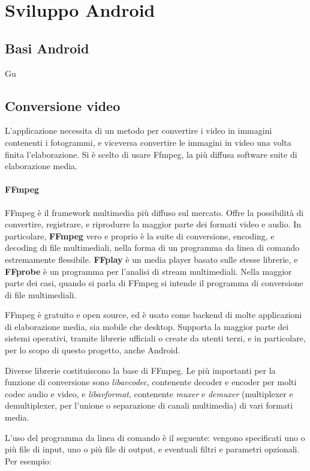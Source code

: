 \chapter{Sviluppo Android}

\section{Basi Android}
Gu


\section{Conversione video}

L'applicazione necessita di un metodo per convertire i video in immagini contenenti i
fotogrammi, e viceversa convertire le immagini in video una volta finita l'elaborazione.
Si è scelto di usare Ffmpeg, la più diffusa software suite di elaborazione media.

\subsubsection*{FFmpeg}

FFmpeg è il framework multimedia più diffuso sul mercato. Offre la possibilità di convertire, 
registrare, e riprodurre la maggior parte dei formati video e audio. In particolare, 
\textbf{FFmpeg} vero e proprio è la suite di conversione, encoding, e decoding di file
multimediali, nella forma di un programma da linea di comando estremamente flessibile.
\textbf{FFplay} è un media player basato sulle stesse librerie, e \textbf{FFprobe} è un
programma per l'analisi di stream multimediali. Nella maggior parte dei casi, quando si
parla di FFmpeg si intende il programma di conversione di file multimediali.

FFmpeg è gratuito e open source, ed è usato come backend di molte applicazioni di elaborazione
media, sia mobile che desktop. Supporta la maggior parte dei sistemi operativi, tramite librerie
ufficiali o create da utenti terzi, e in particolare, per lo scopo di questo progetto, anche
Android. 

Diverse librerie costituiscono la base di FFmpeg. Le più importanti per la funzione di
conversione sono \emph{libavcodec}, contenente decoder e encoder per molti codec audio e video, 
e \emph{libavformat}, contenente \emph{muxer} e \emph{demuxer} (multiplexer e demultiplexer, 
per l'unione o separazione di canali multimedia) di vari formati media.

L'uso del programma da linea di comando è il seguente: vengono specificati uno o più file di 
input, uno o più file di output, e eventuali filtri e parametri opzionali. Per esempio:

